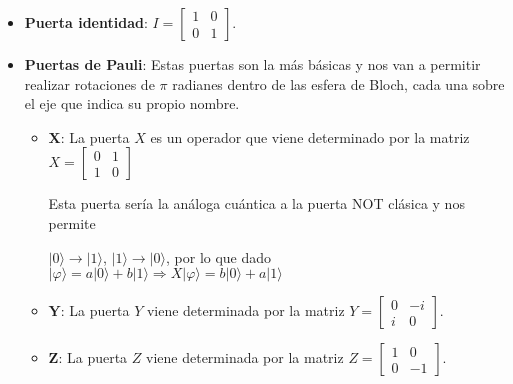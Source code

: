  \begin{itemize}
    \item \textbf{Puerta identidad}: $I = \begin{bmatrix} 1 & 0\\0 & 1 \end{bmatrix}$.
    
    \item \textbf{Puertas de Pauli}: Estas puertas son la más básicas y nos van a permitir realizar rotaciones de $\pi$ radianes dentro de las esfera de Bloch, cada una sobre el eje que indica su propio nombre.
    \begin{itemize}
        \item $\boldsymbol X$: La puerta $X$ es un operador que viene determinado por la matriz \begin{math} X = \begin{bmatrix} 0 & 1\\1 & 0 \end{bmatrix}\end{math}
        
        Esta puerta sería la análoga cuántica a la puerta NOT clásica y nos permite 
        
        \vspace{3pt}
        $|0\rangle \rightarrow |1\rangle$, $|1\rangle \rightarrow |0\rangle$, por lo que dado $|\varphi \rangle = a |0\rangle + b |1\rangle \Rightarrow X|\varphi \rangle = b |0\rangle + a |1\rangle$
        \vspace{3pt}
        
        \item $\boldsymbol Y$: La puerta $Y$ viene determinada por la matriz \begin{math} Y = \begin{bmatrix} 0 & -i\\i & 0 \end{bmatrix}\end{math}.
        \vspace{3pt}
        
        \item $\boldsymbol Z$: La puerta $Z$ viene determinada por la matriz \begin{math} Z = \begin{bmatrix} 1 & 0\\0 & -1 \end{bmatrix}\end{math}.
    \end{itemize}
    

\end{itemize}
